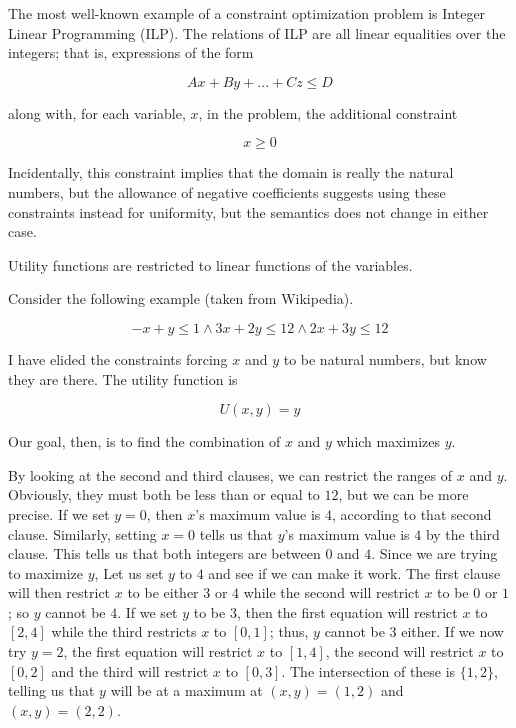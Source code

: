 The most well-known example of a constraint optimization problem is Integer Linear Programming (ILP). The relations of ILP are all linear equalities over the integers; that is, expressions of the form

\begin{equation}
    A x + B y + ... + C z \leq D
\end{equation}

along with, for each variable, $x$, in the problem, the additional constraint

\begin{equation}
    x \geq 0
\end{equation}

Incidentally, this constraint implies that the domain is really the natural numbers, but the allowance of negative coefficients suggests using these constraints instead for uniformity, but the semantics does not change in either case.

Utility functions are restricted to linear functions of the variables.

Consider the following example (taken from Wikipedia).

\begin{equation}
    -x + y \leq 1 \wedge
    3x + 2y \leq 12 \wedge
    2x + 3y \leq 12
\end{equation}

I have elided the constraints forcing $x$ and $y$ to be natural numbers, but know they are there. The utility function is

\begin{equation}
    U(x, y) = y
\end{equation}

Our goal, then, is to find the combination of $x$ and $y$ which maximizes $y$. 

By looking at the second and third clauses, we can restrict the ranges of $x$ and $y$. Obviously, they must both be less than or equal to $12$, but we can be more precise. If we set $y = 0$, then $x$'s maximum value is $4$, according to that second clause. Similarly, setting $x = 0$ tells us that $y$'s maximum value is $4$ by the third clause. This tells us that both integers are between $0$ and $4$. Since we are trying to maximize $y$, Let us set $y$ to $4$ and see if we can make it work. The first clause will then restrict $x$ to be either $3$ or $4$ while the second will restrict $x$ to be $0$ or $1$; so $y$ cannot be $4$. If we set $y$ to be $3$, then the first equation will restrict $x$ to $[2, 4]$ while the third restricts $x$ to $[0, 1]$; thus, $y$ cannot be $3$ either. If we now try $y=2$, the first equation will restrict $x$ to $[1, 4]$, the second will restrict $x$ to $[0, 2]$ and the third will restrict $x$ to $[0, 3]$. The intersection of these is $\{1, 2\}$, telling us that $y$ will be at a maximum at $(x, y) = (1, 2)$ and $(x, y) = (2, 2)$.

